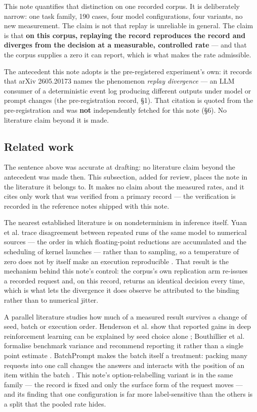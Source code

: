 \documentclass[11pt,a4paper]{article}
\begin{document}
This note quantifies that distinction on one recorded corpus. It is deliberately narrow: one task family, 190 cases, four model configurations, four variants, no new measurement. The claim is not that replay is unreliable in general. The claim is that \textbf{on this corpus, replaying the record reproduces the record and diverges from the decision at a measurable, controlled rate} --- and that the corpus supplies a zero it can report, which is what makes the rate admissible.

The antecedent this note adopts is the pre-registered experiment's own: it records that arXiv 2605.20173 names the phenomenon \emph{replay divergence} --- an LLM consumer of a deterministic event log producing different outputs under model or prompt changes (the pre-registration record, \S1). That citation is quoted from the pre-registration and was \textbf{not} independently fetched for this note (\S6). No literature claim beyond it is made.

\subsection{Related work}

The sentence above was accurate at drafting: no literature claim beyond the antecedent was made then. This subsection, added for review, places the note in the literature it belongs to. It makes no claim about the measured rates, and it cites only work that was verified from a primary record --- the verification is recorded in the reference notes shipped with this note.

The nearest established literature is on nondeterminism in inference itself. Yuan et al. trace disagreement between repeated runs of the same model to numerical sources --- the order in which floating-point reductions are accumulated and the scheduling of kernel launches --- rather than to sampling, so a temperature of zero does not by itself make an execution reproducible \cite{yuanNondeterminism}. That result is the mechanism behind this note's control: the corpus's own replication arm re-issues a recorded request and, on this record, returns an identical decision every time, which is what lets the divergence it does observe be attributed to the binding rather than to numerical jitter.

A parallel literature studies how much of a measured result survives a change of seed, batch or execution order. Henderson et al. show that reported gains in deep reinforcement learning can be explained by seed choice alone \cite{hendersonDeepRL}; Bouthillier et al. formalise benchmark variance and recommend reporting it rather than a single point estimate \cite{bouthillierVariance}. BatchPrompt makes the batch itself a treatment: packing many requests into one call changes the answers and interacts with the position of an item within the batch \cite{linBatchPrompt}. This note's option-relabelling variant is in the same family --- the record is fixed and only the surface form of the request moves --- and its finding that one configuration is far more label-sensitive than the others is a split that the pooled rate hides.
\end{document}
